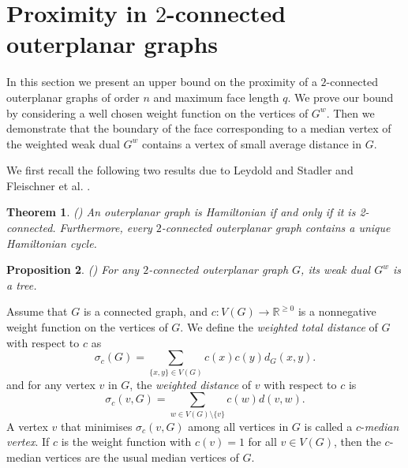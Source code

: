 \documentclass[a4paper,11pt]{article}
\newtheorem{theorem}{Theorem}[section]
\newtheorem{proposition}[theorem]%
{Proposition}
\numberwithin{equation}{theorem}
\begin{document}
 


























\section{Proximity in $2$-connected outerplanar graphs}
\label{section:proximity-in-2-connected-OP}

In this section we present an upper bound on the proximity of a $2$-connected outerplanar graphs of 
order $n$ and maximum face length $q$.   
We prove our bound by considering a well chosen weight 
function on the vertices of $G^w$. Then we demonstrate that the boundary of the face corresponding to a 
median vertex of the weighted weak dual $G^w$ contains a vertex of small average distance in $G$. 

We first recall the following two results due to Leydold and Stadler \cite{LeySta1998} 
and Fleischner et al. \cite{FleGelHar1974}.



\begin{theorem}{\rm (\cite{LeySta1998})}
\label{theo:Outerplanar-unique-cycle}
An outerplanar graph is Hamiltonian if and only if it is 2-connected. Furthermore, every 
$2$-connected outerplanar graph contains a unique Hamiltonian cycle.
\end{theorem}



\begin{proposition}{\rm (\cite{FleGelHar1974})}
\label{prop:dual-is-a-tree}
For any $2$-connected outerplanar graph $G$, its weak dual $G^w$ is a tree.
\end{proposition}

Assume that $G$ is a connected graph, and $c: V(G) \rightarrow \mathbb{R}^{\geq 0}$ is a 
nonnegative weight function on the vertices of $G$. We define the \textit{weighted total distance} 
of $G$ with respect to $c$ as
\[
\sigma_c(G) = \sum_{\{x,y\} \in V(G)} c(x)c(y) d_G(x,y).
\]
and for any vertex $v$ in $G$, the \textit{weighted distance} of $v$ with respect to $c$ is 
\[
\sigma_c(v,G) = \sum_{w \in V(G) \setminus \{v\}} c(w) d(v,w).
\]
A vertex $v$ that minimises $\sigma_c(v,G)$ among all vertices in $G$ is called 
a $c$-\textit{median vertex}. 
If $c$ is the weight function with $c(v)=1$ for all $v \in V(G)$, then the $c$-median vertices 
are the usual median vertices of $G$. 
\end{document}
